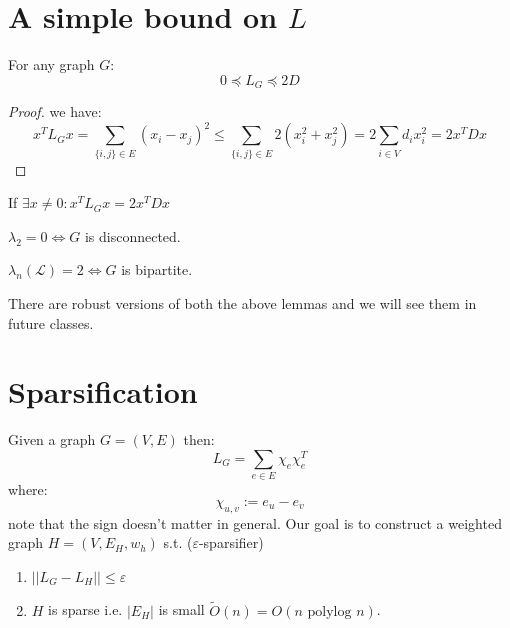 \documentclass[11pt]{article}
\begin{document}

\section*{A simple bound on $L$}

\begin{lemma}
For any graph $G$:
\[
    0 \preceq L_G \preceq 2D
\]
\end{lemma}
\begin{proof}
we have:
\[
    x^TL_Gx = \sum_{\{i,j\}\in E} (x_i - x_j)^2 \leq \sum_{\{i,j\}\in E} 2(x_i^2 + x_j^2) = 2 \sum_{i \in V}d_i x_i^2 = 2x^TDx
\]
\end{proof}
\begin{lemma}
If $\exists x \neq 0: x^TL_Gx = 2x^TDx$
\end{lemma}

\begin{lemma}
$\lambda_2 = 0 \iff G$ is disconnected.
\end{lemma}

\begin{lemma}
$\lambda_n(\mathcal{L}) = 2 \iff G$ is bipartite.
\end{lemma}

There are robust versions of both the above lemmas and we will see them in future classes.

\section*{Sparsification}
Given a graph $G=(V,E)$ then:
\[
    L_G = \sum_{e\in E} \chi_e\chi_e^T
\]
where:
\[
    \chi_{u,v}:= e_u - e_v
\]
note that the sign doesn't matter in general. Our goal is to construct a weighted graph $H=(V,E_H,w_h)$ s.t. ($\varepsilon$-sparsifier)
\begin{enumerate}
    \item $|| L_G- L_H||\leq \varepsilon$
    \item $H$ is sparse i.e. $|E_H|$ is small $\tilde{O}(n) = O(n\text{ polylog }n)$. 
\end{enumerate}
\end{document}

